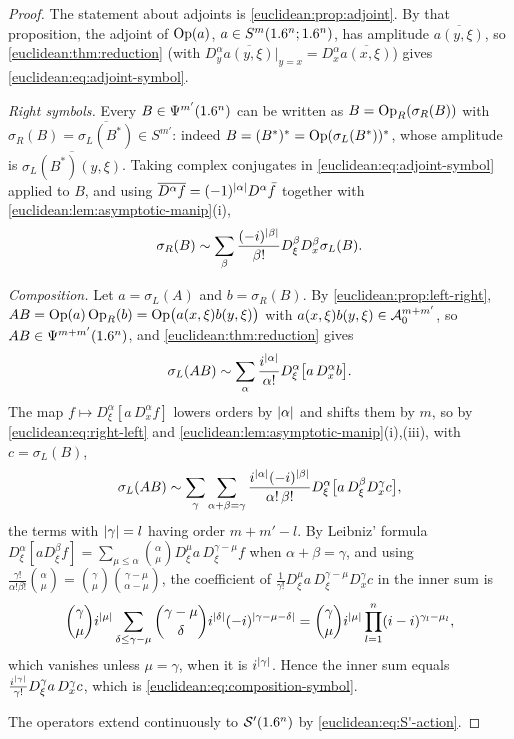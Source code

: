 \begin{proof}
  The statement about adjoints is \cref{euclidean:prop:adjoint}. By that
  proposition, the adjoint of $\operatorname{Op}(a)$, $a\in S^m(1.6^n;1.6^n)$, has amplitude
  $\overline{a(y,\xi)}$, so \cref{euclidean:thm:reduction} (with
  $D^\alpha_y\overline{a(y,\xi)}|_{y=x}=D^\alpha_x\overline{a(x,\xi)}$) gives
  \eqref{euclidean:eq:adjoint-symbol}.

  \emph{Right symbols.} Every $B\in\Psi^{m'}(1.6^n)$ can be written as
  $B=\operatorname{Op}_R(\sigma_R(B))$ with $\sigma_R(B)=\overline{\sigma_L(B^*)}\in S^{m'}$:
  indeed $B=(B^*)^*=\operatorname{Op}(\sigma_L(B^*))^*$, whose amplitude is
  $\overline{\sigma_L(B^*)(y,\xi)}$. Taking complex conjugates in
  \eqref{euclidean:eq:adjoint-symbol} applied to $B$, and using
  $\overline{D^\alpha f}=(-1)^{\lvert \alpha\rvert}D^\alpha\bar f$ together with
  \cref{euclidean:lem:asymptotic-manip}(i),
  \begin{equation}\label{euclidean:eq:right-left}
    \sigma_R(B)\sim\sum_\beta\frac{(-i)^{\lvert \beta\rvert}}{\beta!}
    D^\beta_\xi D^\beta_x\sigma_L(B).
  \end{equation}

  \emph{Composition.} Let $a=\sigma_L(A)$ and $b=\sigma_R(B)$. By
  \cref{euclidean:prop:left-right},
  $AB=\operatorname{Op}(a)\operatorname{Op}_R(b)=\operatorname{Op}\bigl(a(x,\xi)b(y,\xi)\bigr)$ with
  $a(x,\xi)b(y,\xi)\in\mathcal{A}^{m+m'}_{0}$, so $AB\in\Psi^{m+m'}(1.6^n)$, and
  \cref{euclidean:thm:reduction} gives
  \begin{equation*}
    \sigma_L(AB)\sim\sum_\alpha\frac{i^{\lvert \alpha\rvert}}{\alpha!}
    D^\alpha_\xi\bigl[a\,D^\alpha_xb\bigr].
  \end{equation*}
  The map $f\mapsto D^\alpha_\xi[a\,D^\alpha_xf]$ lowers orders by
  $\lvert \alpha\rvert$ and shifts them by $m$, so by
  \eqref{euclidean:eq:right-left} and
  \cref{euclidean:lem:asymptotic-manip}(i),(iii), with $c=\sigma_L(B)$,
  \begin{equation*}
    \sigma_L(AB)\sim\sum_\gamma\sum_{\alpha+\beta=\gamma}
    \frac{i^{\lvert \alpha\rvert}(-i)^{\lvert \beta\rvert}}{\alpha!\,\beta!}
    D^\alpha_\xi\bigl[a\,D^\beta_\xi D^\gamma_xc\bigr],
  \end{equation*}
  the terms with $\lvert \gamma\rvert=l$ having order $m+m'-l$. By Leibniz' formula
  $D^\alpha_\xi[aD^\beta_\xi f]=\sum_{\mu\le\alpha}\binom\alpha\mu D^\mu_\xi a\,
  D^{\gamma-\mu}_\xi f$ when $\alpha+\beta=\gamma$, and using
  $\frac{\gamma!}{\alpha!\beta!}\binom\alpha\mu=\binom\gamma\mu\binom{\gamma-\mu}{\alpha-\mu}$,
  the coefficient of $\frac1{\gamma!}D^\mu_\xi a\,D^{\gamma-\mu}_\xi D^\gamma_xc$
  in the inner sum is
  \begin{equation*}
    \binom\gamma\mu i^{\lvert \mu\rvert}\sum_{\delta\le\gamma-\mu}
    \binom{\gamma-\mu}\delta i^{\lvert \delta\rvert}(-i)^{\lvert \gamma-\mu-\delta\rvert}
    =\binom\gamma\mu i^{\lvert \mu\rvert}\prod_{l=1}^n(i-i)^{\gamma_l-\mu_l},
  \end{equation*}
  which vanishes unless $\mu=\gamma$, when it is $i^{\lvert \gamma\rvert}$. Hence the
  inner sum equals $\frac{i^{\lvert \gamma\rvert}}{\gamma!}D^\gamma_\xi a\,D^\gamma_xc$,
  which is \eqref{euclidean:eq:composition-symbol}.

  The operators extend continuously to $\mathcal{S}'(1.6^n)$ by
  \eqref{euclidean:eq:S'-action}.
\end{proof}

